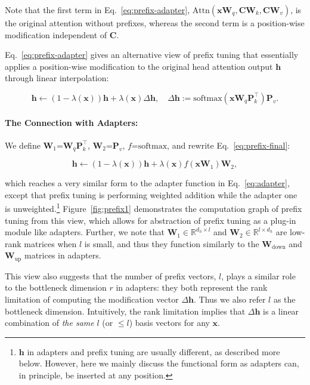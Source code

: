  
Note that the first term in Eq.~\ref{eq:prefix-adapter}, $\text{Attn}({\bm{x}}{\bm{W}}_q, {\bm{C}}{\bm{W}}_k, {\bm{C}}{\bm{W}}_v)$, is the original attention without prefixes, whereas the second term is a position-wise modification independent of ${\bm{C}}$. 

Eq.~\ref{eq:prefix-adapter} gives an alternative view of prefix tuning that essentially applies a position-wise modification to the original head attention output ${\bm{h}}$ through linear interpolation:

\begin{equation}
\label{eq:prefix-final}
{\bm{h}} \leftarrow (1-\lambda({\bm{x}})){\bm{h}} + \lambda({\bm{x}})\Delta{\bm{h}}, \quad \Delta{\bm{h}} := \text{softmax}({\bm{x}}{\bm{W}}_q{\bm{P}}_k^\top){\bm{P}}_v.
\end{equation}

\paragraph{The Connection with Adapters:} We define ${\bm{W}}_1$=${\bm{W}}_q{\bm{P}}_k^\top$, ${\bm{W}}_2$=${\bm{P}}_v$, $f$=$\text{softmax}$, and rewrite Eq.~\ref{eq:prefix-final}:

\begin{equation}
\label{eq:prefix-final2}
{\bm{h}} \leftarrow (1-\lambda({\bm{x}})){\bm{h}} + \lambda({\bm{x}}) f({\bm{x}}{\bm{W}}_1){\bm{W}}_2,
\end{equation}

which reaches a very similar form to the adapter function in Eq.~\ref{eq:adapter}, except that prefix tuning is performing weighted addition while the adapter one is unweighted.\footnote{

${\bm{h}}$ in adapters and prefix tuning are usually different, as described more below. However, here we mainly discuss the functional form as adapters can, in principle, be inserted at any position. } Figure~\ref{fig:prefix1} demonstrates the computation graph of prefix tuning from this view, which allows for abstraction of prefix tuning as a plug-in module like adapters. Further, we note that ${\bm{W}}_1 \in {\mathbb{R}}^{d_h\times l}$ and ${\bm{W}}_2 \in {\mathbb{R}}^{l\times d_h}$ are low-rank matrices when $l$ is small, and thus they function similarly to the ${\bm{W}}_{\text{down}}$ and ${\bm{W}}_{\text{up}}$ matrices in adapters. 

This view also suggests that the number of prefix vectors, $l$, plays a similar role to the bottleneck dimension $r$ in adapters: they both represent the rank limitation of computing the modification vector $\Delta {\bm{h}}$. Thus we also refer $l$ as the bottleneck dimension. Intuitively, the rank limitation implies that $\Delta {\bm{h}}$ is a linear combination of \emph{the same} $l$ (or $\le l$) basis vectors for any ${\bm{x}}$.  

